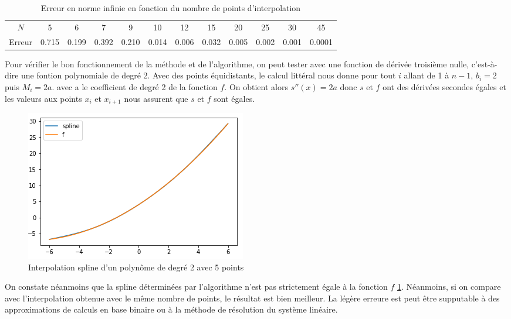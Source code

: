 \begin{table}[h]
  \centering
\begin{tabular}{cccccccccccc}
    $N$ & 5 & 6 & 7 & 9 & 10 & 12 & 15 & 20 & 25 & 30 & 45  \\
   Erreur & 0.715 & 0.199 & 0.392 & 0.210 & 0.014 & 0.006 & 0.032 & 0.005 & 0.002 & 0.001 & 0.0001 \\
\end{tabular}
  \caption{Erreur en norme infinie en fonction du nombre de points d'interpolation}
  \label{table:errspl}
\end{table}

Pour vérifier le bon fonctionnement de la méthode et de l'algorithme, on peut tester avec une fonction de dérivée troisième nulle,
c'est-à-dire une fontion polynomiale de degré 2. Avec des points équidistants, le calcul littéral nous donne pour tout $i$ allant de
1 à $n-1$, $b_i = 2$ puis $M_i = 2a$. avec a le coefficient de degré 2 de la fonction $f$. On obtient alors $s''(x) = 2a$ donc $s$ et $f$
ont des dérivées secondes égales et les valeurs aux points $x_i$ et $x_{i+1}$ nous assurent que $s$ et $f$ sont égales.

\begin{figure}[h]
  \centering
  \includegraphics[scale=1.0]{fig9}
  \caption{Interpolation spline d'un polynôme de degré 2 avec 5 points}
  \label{fig:7:noerr}
\end{figure}

On constate néanmoins que la spline déterminées par l'algorithme n'est pas strictement égale à la fonction $f$ \ref{fig:7:noerr}. Néanmoins, si on compare avec l'interpolation obtenue avec le même nombre de points, le résultat est bien meilleur. La légère erreure est peut être supputable à des approximations de calculs en base binaire ou à la méthode de résolution du système linéaire.

